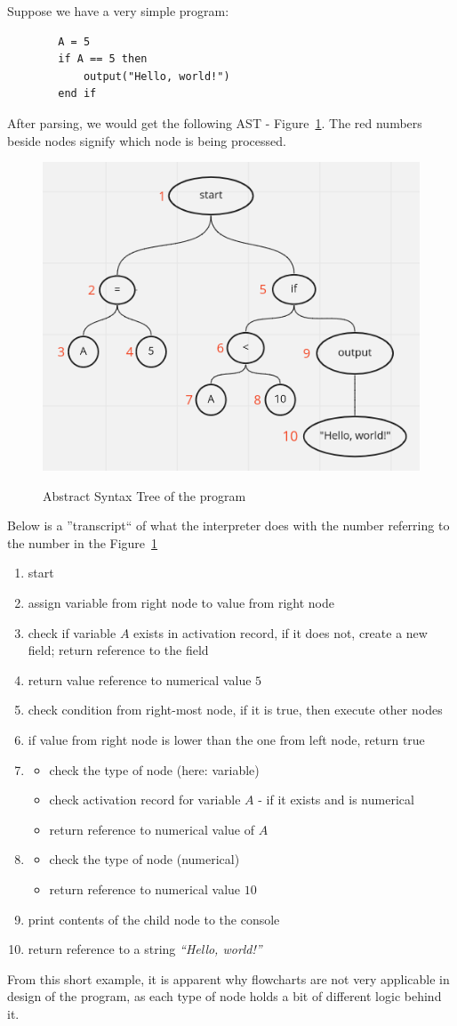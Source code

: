\documentclass{article}
\begin{document}
    Suppose we have a very simple program:
    \begin{verbatim}
        A = 5
        if A == 5 then
            output("Hello, world!")
        end if
    \end{verbatim}
    After parsing, we would get the following AST - Figure~\ref{fig:AST}. The 
    red numbers beside nodes signify which node is being processed. 
    \begin{figure}[H]
        \centering
        \caption{Abstract Syntax Tree of the program}
        \includegraphics[width=0.5\linewidth]{AST}
        \label{fig:AST}
    \end{figure}
    Below is a ''transcript`` of what the interpreter does with the number referring
    to the number in the Figure~\ref{fig:AST}
    \begin{enumerate}
        \item start
        \item assign variable from right node to value from right node
        \item check if variable $A$ exists in activation record, if it does not,
            create a new field; return reference to the field
        \item return value reference to numerical value $5$
        \item check condition from right-most node, if it is true, then execute 
            other nodes
        \item if value from right node is lower than the one from left node, return
            true
        \item 
            \begin{itemize}
                \item check the type of node (here: variable)
                \item check activation record for variable $A$ - if it exists 
                    and is numerical
                \item return reference to numerical value of $A$
            \end{itemize}
        \item 
            \begin{itemize}
                \item check the type of node (numerical)
                \item return reference to numerical value $10$
            \end{itemize}
        \item print contents of the child node to the console
        \item return reference to a string \textit{``Hello, world!''}
    \end{enumerate}

    From this short example, it is apparent why flowcharts are not very applicable
    in design of the program, as each type of node holds a bit of different logic
    behind it.
\end{document}
